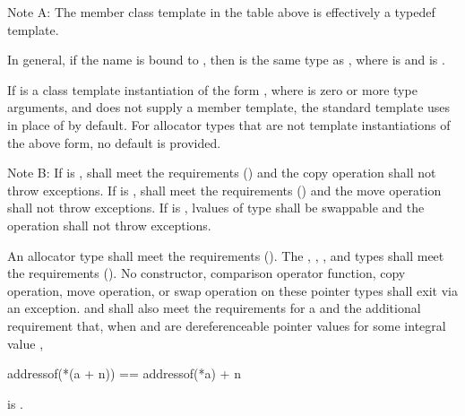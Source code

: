 \pnum
Note A: The member class template  in the table above is
effectively a typedef template.
\begin{note}
In general, if
the name  is bound to , then
 is the same type as
, where
 is  and
 is .
\end{note}
If
 is a class template instantiation of the form
, where  is zero or more type
arguments, and  does not supply a  member
template, the standard  template uses
 in place of 
by default. For allocator types that are not template instantiations of the
above form, no default is provided.

\pnum
Note B:
If  is ,
 shall meet the
 requirements ()
and the copy operation shall not throw exceptions.
If  is ,
 shall meet the
 requirements ()
and the move operation shall not throw exceptions.
If  is ,
lvalues of type  shall be swappable
and the  operation shall not throw exceptions.

\pnum
An allocator type  shall meet the
 requirements ().
The , , , and
 types shall meet the
 requirements ().
No constructor,
comparison operator function, copy operation, move operation, or swap operation on
these pointer types shall exit via an exception.  and  shall also
meet the requirements for
a  and
the additional requirement that, when  and  are
dereferenceable pointer values for some integral value ,
\begin{codeblock}
addressof(*(a + n)) == addressof(*a) + n
\end{codeblock}
is .

